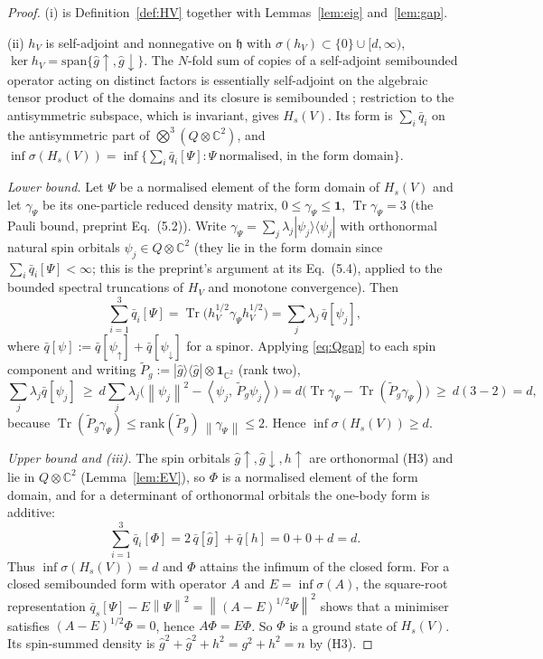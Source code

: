 \documentclass[11pt,a4paper]{article}
\theoremstyle{plain}
\theoremstyle{definition}
\theoremstyle{remark}
\newcommand{\C}{\mathbb{C}}
\newcommand{\norm}[1]{\left\|#1\right\|}
\newcommand{\ip}[2]{\left\langle #1,\,#2\right\rangle}
\DeclareMathOperator{\Tr}{Tr}
\newcommand{\hg}{\hat g}
\begin{document}
\begin{proof}
(i) is Definition~\ref{def:HV} together with Lemmas~\ref{lem:eig} and~\ref{lem:gap}.

(ii) $h_V$ is self-adjoint and nonnegative on $\mathfrak h$ with $\sigma(h_V)\subset\{0\}\cup[d,\infty)$, $\ker h_V=\mathrm{span}\{\hg\!\uparrow,\hg\!\downarrow\}$. The $N$-fold sum of copies of a self-adjoint semibounded operator acting on distinct factors is essentially self-adjoint on the algebraic tensor product of the domains and its closure is semibounded \cite[Thm.~VIII.33]{RS1}; restriction to the antisymmetric subspace, which is invariant, gives $H_s(V)$. Its form is $\sum_i\bar q_i$ on the antisymmetric part of $\bigotimes^3(Q\otimes\C^2)$, and $\inf\sigma(H_s(V))=\inf\{\sum_i\bar q_i[\Psi]:\Psi\ \text{normalised, in the form domain}\}$.

\emph{Lower bound.} Let $\Psi$ be a normalised element of the form domain of $H_s(V)$ and let $\gamma_\Psi$ be its one-particle reduced density matrix, $0\le\gamma_\Psi\le\mathbf 1$, $\Tr\gamma_\Psi=3$ (the Pauli bound, preprint Eq.~(5.2)). Write $\gamma_\Psi=\sum_j\lambda_j|\psi_j\rangle\langle\psi_j|$ with orthonormal natural spin orbitals $\psi_j\in Q\otimes\C^2$ (they lie in the form domain since $\sum_i\bar q_i[\Psi]<\infty$; this is the preprint's argument at its Eq.~(5.4), applied to the bounded spectral truncations of $H_V$ and monotone convergence). Then
\[
\sum_{i=1}^3\bar q_i[\Psi]=\Tr\big(h_V^{1/2}\gamma_\Psi h_V^{1/2}\big)=\sum_j\lambda_j\,\bar q[\psi_j],
\]
where $\bar q[\psi]:=\bar q[\psi_\uparrow]+\bar q[\psi_\downarrow]$ for a spinor. Applying \eqref{eq:Qgap} to each spin component and writing $\tilde P_g:=|\hg\rangle\langle\hg|\otimes\mathbf 1_{\C^2}$ (rank two),
\[
\sum_j\lambda_j\bar q[\psi_j]\ \ge\ d\sum_j\lambda_j\big(\norm{\psi_j}^2-\ip{\psi_j}{\tilde P_g\psi_j}\big)=d\big(\Tr\gamma_\Psi-\Tr(\tilde P_g\gamma_\Psi)\big)\ \ge\ d(3-2)=d ,
\]
because $\Tr(\tilde P_g\gamma_\Psi)\le\mathrm{rank}(\tilde P_g)\,\norm{\gamma_\Psi}\le2$. Hence $\inf\sigma(H_s(V))\ge d$.

\emph{Upper bound and (iii).} The spin orbitals $\hg\!\uparrow,\hg\!\downarrow,h\!\uparrow$ are orthonormal (H3) and lie in $Q\otimes\C^2$ (Lemma~\ref{lem:EV}), so $\Phi$ is a normalised element of the form domain, and for a determinant of orthonormal orbitals the one-body form is additive:
\[
\sum_{i=1}^3\bar q_i[\Phi]=2\,\bar q[\hg]+\bar q[h]=0+0+d=d .
\]
Thus $\inf\sigma(H_s(V))=d$ and $\Phi$ attains the infimum of the closed form. For a closed semibounded form with operator $A$ and $E=\inf\sigma(A)$, the square-root representation $\bar q_s[\Psi]-E\norm\Psi^2=\norm{(A-E)^{1/2}\Psi}^2$ \cite[VI, Thm.~2.23]{Kato} shows that a minimiser satisfies $(A-E)^{1/2}\Phi=0$, hence $A\Phi=E\Phi$. So $\Phi$ is a ground state of $H_s(V)$. Its spin-summed density is $\hg^2+\hg^2+h^2=g^2+h^2=n$ by (H3).


\end{proof}
\end{document}
